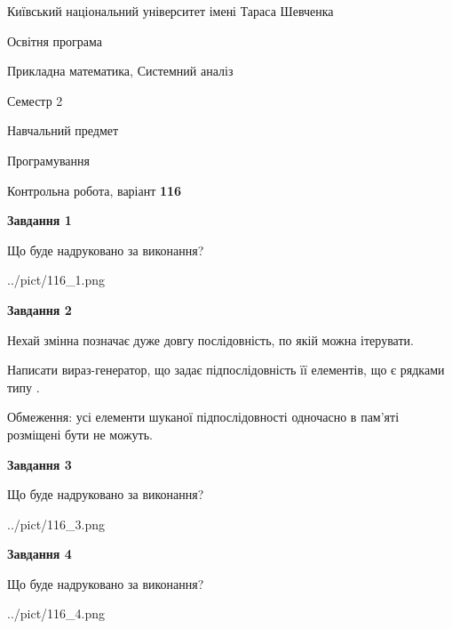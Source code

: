 \documentclass[12pt, ukrainian]{article}
\begin{document}
{{\begin {small}\par
{ \center  Київський національний університет імені Тараса Шевченка \par}
{\parbox {5 cm}{Освітня програма \hfill}{\parbox {8 cm}{Прикладна математика, Системний аналіз \hfill}}\parbox {5 cm}{\hfill Семестр 2}}\par
{\parbox {5 cm} {Навчальний предмет \hfill}\parbox {7 cm}{Програмування \hfill}\parbox {6cm}{\hfill}\par}\vspace{-7pt} \end{small}}{\center Контрольна робота, варіант  \No \textbf
{ 116 }\par}}
{
\begin {large}
{\begin {center}\textbf{Завдання 1}\end {center}}\par
Що буде надруковано за виконання?\par\par
\begin{center}
	{../pict/116_1.png}
\end{center}
\newpage

{\begin {center}\textbf{Завдання 2}\end {center}}\par
Нехай змінна  позначає дуже довгу послідовність, по якій можна ітерувати.

Написати вираз-генератор, що задає підпослідовність її елементів, що є рядками типу .

Обмеження: усі елементи шуканої підпослідовності одночасно в пам'яті розміщені бути не можуть.\par
\newpage

{\begin {center}\textbf{Завдання 3}\end {center}}\par
Що буде надруковано за виконання?
\begin{center}
	{../pict/116_3.png}
\end{center}
\newpage

{\begin {center}\textbf{Завдання 4}\end {center}}\par
Що буде надруковано за виконання?\par
\begin{center}
	{../pict/116_4.png}
\end{center}
\newpage


\end{large}}
\end{document}

